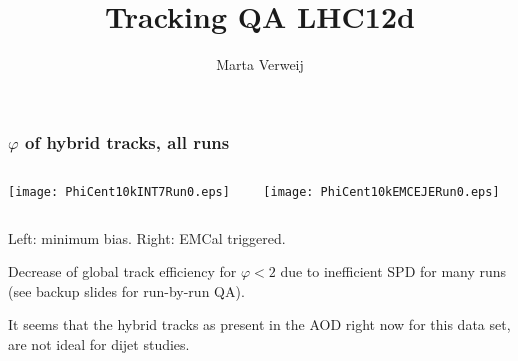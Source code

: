 \documentclass[8pt,t]{beamer}
\begin{document}
\title{Tracking QA LHC12d}
\author{Marta Verweij}

\begin{frame}[plain]
  \titlepage
\end{frame}

\begin{frame}
\frametitle{$\varphi$ of hybrid tracks, all runs}

\begin{columns}
\begin{column}{0.5\textwidth}
   \texttt{[image: PhiCent10kINT7Run0.eps]}
\end{column}
\begin{column}{0.5\textwidth}
   \texttt{[image: PhiCent10kEMCEJERun0.eps]}
\end{column}
\end{columns}

Left: minimum bias. Right: EMCal triggered.

\color{red}{For $\varphi \sim 6$ anti-dijet tracking inefficiency.}

\color{black}
Decrease of global track efficiency for $\varphi<2$ due to inefficient SPD for
many runs (see backup slides for run-by-run QA).

\color{blue}
It seems that the hybrid tracks as present in the AOD right now for this data set, are not ideal
for dijet studies.
\color{black}
\end{frame}


\end{document}
